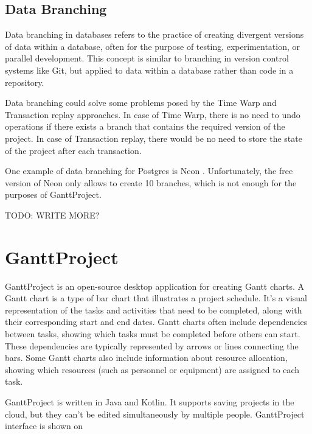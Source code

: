 \documentclass[a4paper, 11pt, oneside]{article}
\theoremstyle{definition}
\begin{document}
\subsection{Data Branching}

Data branching in databases refers to the practice of creating divergent versions of data within a database, often for the purpose of testing, experimentation, or parallel development. This concept is similar to branching in version control systems like Git, but applied to data within a database rather than code in a repository.

Data branching could solve some problems posed by the Time Warp and Transaction replay approaches. In case of Time Warp, there is no need to undo operations if there exists a branch that contains the required version of the project. In case of Transaction replay, there would be no need to store the state of the project after each transaction. 

One example of data branching for Postgres is Neon \cite{neon}. Unfortunately, the free version of Neon only allows to create 10 branches, which is not enough for the purposes of GanttProject.

TODO: WRITE MORE?

\section{GanttProject}

GanttProject is an open-source desktop application for creating Gantt charts. A Gantt chart is a type of bar chart that illustrates a project schedule. It's a visual representation of the tasks and activities that need to be completed, along with their corresponding start and end dates. Gantt charts often include dependencies between tasks, showing which tasks must be completed before others can start. These dependencies are typically represented by arrows or lines connecting the bars. Some Gantt charts also include information about resource allocation, showing which resources (such as personnel or equipment) are assigned to each task.

GanttProject is written in Java and Kotlin. It supports saving projects in the cloud, but they can't be edited simultaneously by multiple people. GanttProject interface is shown on  
\end{document}
